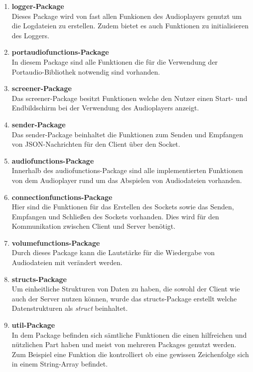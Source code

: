 \begin{enumerate}
\item \textbf{logger-Package} \\
Dieses Package wird von fast allen Funkionen des Audioplayers genutzt um die Logdateien zu erstellen. Zudem bietet es auch Funktionen zu initialisieren des Loggers.

\item \textbf{portaudiofunctions-Package} \\
In diesem Package sind alle Funktionen die für die Verwendung der Portaudio-Bibliothek notwendig sind vorhanden. 


\item \textbf{screener-Package} \\
Das screener-Package besitzt Funktionen welche den Nutzer einen Start- und Endbildschirm bei der Verwendung des Audioplayers anzeigt.


\item \textbf{sender-Package} \\
Das sender-Package beinhaltet die Funktionen zum Senden und Empfangen von JSON-Nachrichten für den Client über den Socket.


\item \textbf{audiofunctions-Package} \\
Innerhalb des audiofunctions-Package sind alle implementierten Funktionen von dem Audioplayer rund um das Abspielen von Audiodateien vorhanden.

\item \textbf{connectionfunctions-Package} \\
Hier sind die Funktionen für das Erstellen des Sockets sowie das Senden, Empfangen und Schließen des Sockets vorhanden. Dies wird für den Kommunikation zwischen Client und Server benötigt.

\item \textbf{volumefunctions-Package} \\
Durch dieses Package kann die Lautstärke für die Wiedergabe von Audiodateien mit verändert werden.

\item \textbf{structs-Package} \\
Um einheitliche Strukturen von Daten zu haben, die sowohl der Client wie auch der Server nutzen können, wurde das structs-Package erstellt welche Datenstrukturen als \textit{struct} beinhaltet.

\item \textbf{util-Package} \\
In dem Package befinden sich sämtliche Funktionen die einen hilfreichen und nützlichen Part haben und meist von mehreren Packages genutzt werden. Zum Beispiel eine Funktion die kontrolliert ob eine gewissen Zeichenfolge sich in einem String-Array befindet.
\end{enumerate}



